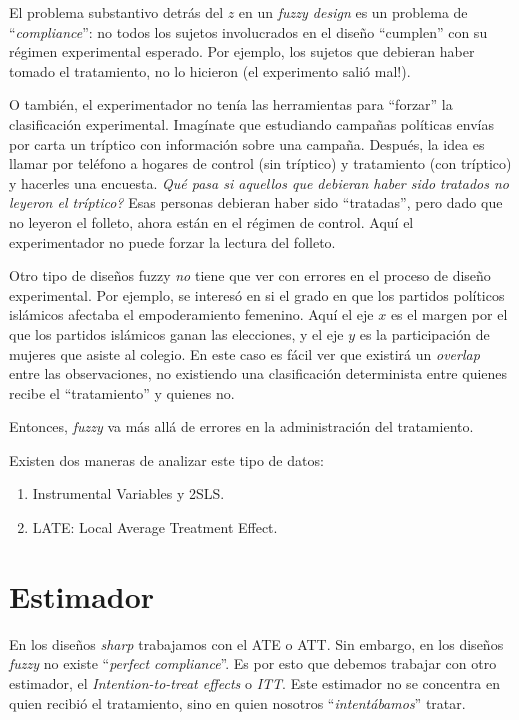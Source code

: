 \documentclass[onesided]{article}\usepackage[]{graphicx}\usepackage[]{color}
\begin{document}
El problema substantivo detr\'as del $z$ en un \emph{fuzzy design} es un problema de ``\emph{compliance}'': no todos los sujetos involucrados en el dise\~no ``cumplen'' con su r\'egimen experimental esperado. Por ejemplo, los sujetos que debieran haber tomado el tratamiento, no lo hicieron (el experimento sali\'o mal!). 

O tambi\'en, el experimentador no ten\'ia las herramientas para ``forzar'' la clasificaci\'on experimental. Imag\'inate que estudiando campa\~nas pol\'iticas env\'ias por carta un tr\'iptico con informaci\'on sobre una campa\~na. Despu\'es, la idea es llamar por tel\'efono a hogares de control (sin tr\'iptico) y tratamiento (con tr\'iptico) y hacerles una encuesta. \emph{Qu\'e pasa si aquellos que debieran haber sido tratados no leyeron el tr\'iptico?} Esas personas debieran haber sido ``tratadas'', pero dado que no leyeron el folleto, ahora est\'an en el r\'egimen de control. Aqu\'i el experimentador no puede forzar la lectura del folleto. 

Otro tipo de dise\~nos fuzzy \emph{no} tiene que ver con errores en el proceso de dise\~no experimental. Por ejemplo, \textcite[244]{ErikMe2014} se interes\'o en si el grado en que los partidos pol\'iticos isl\'amicos afectaba el empoderamiento femenino. Aqu\'i el eje $x$ es el margen por el que los partidos isl\'amicos ganan las elecciones, y el eje $y$ es la participaci\'on de mujeres que asiste al colegio. En este caso es f\'acil ver que existir\'a un \emph{overlap} entre las observaciones, no existiendo una clasificaci\'on determinista entre quienes recibe el ``tratamiento'' y quienes no.

Entonces, \emph{fuzzy} va m\'as all\'a de errores en la administraci\'on del tratamiento.

Existen dos maneras de analizar este tipo de datos:

\begin{enumerate}
  \item Instrumental Variables y 2SLS.
  \item LATE: Local Average Treatment Effect.
\end{enumerate}

\section{Estimador}

En los dise\~nos \emph{sharp} trabajamos con el ATE o ATT. Sin embargo, en los dise\~nos \emph{fuzzy} no existe ``\emph{perfect compliance}''. Es por esto que debemos trabajar con otro estimador, el \emph{Intention-to-treat effects} o \emph{ITT}. Este estimador no se concentra en quien recibi\'o el tratamiento, sino en quien nosotros ``\emph{intent\'abamos}'' tratar.
\end{document}
